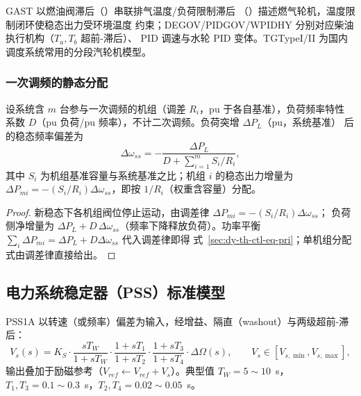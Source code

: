 \begin{remark}
GAST 以燃油阀滞后（）串联排气温度/负荷限制滞后
（）描述燃气轮机，温度限制闭环使稳态出力受环境温度
约束；DEGOV/PIDGOV/WPIDHY 分别对应柴油执行机构（$T_a,T_b$ 超前-滞后）、
PID 调速与水轮 PID 变体。TGTypeI/II 为国内调度系统常用的分段汽轮机模型。
\end{remark}

\subsubsection{一次调频的静态分配}

\begin{proposition}[多机一次调频稳态分配]\label{sec:dy-th-ctl-prop-primary}
设系统含 $m$ 台参与一次调频的机组（调差 $R_i$，pu 于各自基准），负荷频率特性
系数 $D$（pu 负荷/pu 频率），不计二次调频。负荷突增 $\Delta P_L$（pu，系统基准）
后的稳态频率偏差为
\begin{equation}
\Delta\omega_{ss}=-\frac{\Delta P_L}{D+\sum_{i=1}^{m}S_i/R_i},
\label{sec:dy-th-ctl-eq-pri}
\end{equation}
其中 $S_i$ 为机组基准容量与系统基准之比；机组 $i$ 的稳态出力增量为
$\Delta P_{mi}=-(S_i/R_i)\Delta\omega_{ss}$，即按 $1/R_i$（权重含容量）分配。
\end{proposition}

\begin{proof}
新稳态下各机组阀位停止运动，由调差律 $\Delta P_{mi}=-(S_i/R_i)\Delta\omega_{ss}$；
负荷侧净增量为 $\Delta P_L+D\,\Delta\omega_{ss}$（频率下降释放负荷）。功率平衡
$\sum_i\Delta P_{mi}=\Delta P_L+D\Delta\omega_{ss}$ 代入调差律即得
式~\eqref{sec:dy-th-ctl-eq-pri}；单机组分配式由调差律直接给出。
\end{proof}

\subsection{电力系统稳定器（PSS）标准模型}\label{sec:dy-th-ctl-pss}

\begin{definition}\label{sec:dy-th-ctl-def-pss1a}
PSS1A 以转速（或频率）偏差为输入，经增益、隔直（washout）与两级超前-滞后：
\begin{equation}
V_s(s)=K_S\cdot\frac{sT_W}{1+sT_W}\cdot
\frac{1+sT_1}{1+sT_2}\cdot\frac{1+sT_3}{1+sT_4}\cdot\Delta\Omega(s),
\qquad V_s\in[V_{s,\min},V_{s,\max}],
\label{sec:dy-th-ctl-eq-pss1a}
\end{equation}
输出叠加于励磁参考（$V_{ref}\leftarrow V_{ref}+V_s$）。典型值
$T_W=5\sim10$~s，$T_1,T_3=0.1\sim0.3$~s，$T_2,T_4=0.02\sim0.05$~s。
\end{definition}

